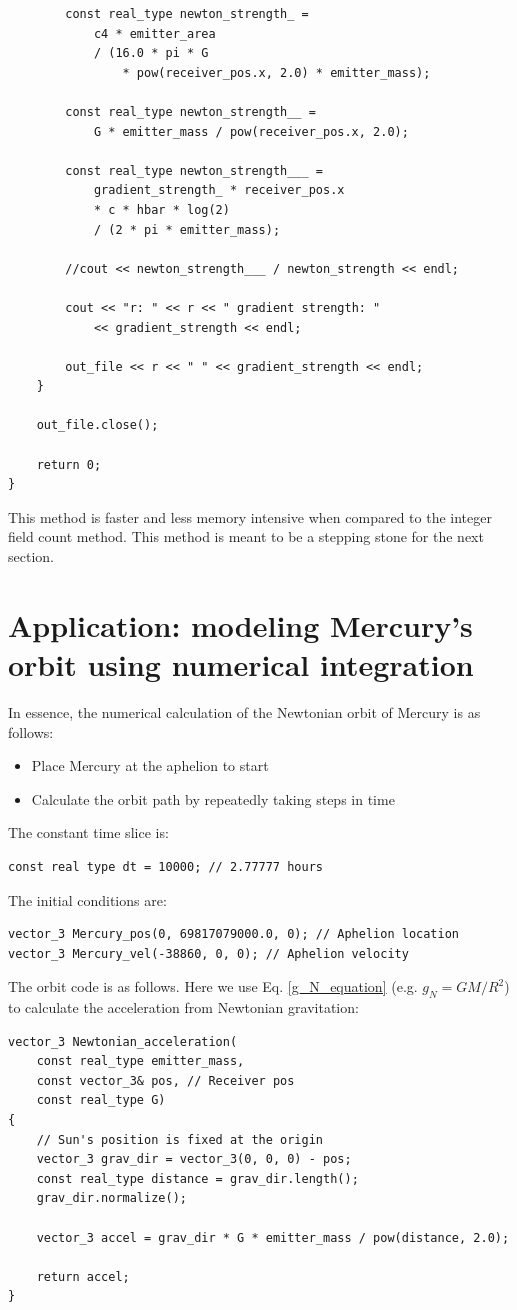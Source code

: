 \documentclass[12pt]{article}
\begin{document}
\begin{lstlisting}
		const real_type newton_strength_ =
			c4 * emitter_area
			/ (16.0 * pi * G 
				* pow(receiver_pos.x, 2.0) * emitter_mass);

		const real_type newton_strength__ =
			G * emitter_mass / pow(receiver_pos.x, 2.0);

		const real_type newton_strength___ =
			gradient_strength_ * receiver_pos.x 
			* c * hbar * log(2)
			/ (2 * pi * emitter_mass);

		//cout << newton_strength___ / newton_strength << endl;

		cout << "r: " << r << " gradient strength: "
			<< gradient_strength << endl;

		out_file << r << " " << gradient_strength << endl;
	}

	out_file.close();

	return 0;
}
\end{lstlisting}

This method is faster and less memory intensive when compared to the integer field count method.
This method is meant to be a stepping stone for the next section.




\section{Application: modeling Mercury's orbit using numerical integration}

In essence, the numerical calculation of the Newtonian orbit of Mercury is as follows:
\begin{itemize}
\item Place Mercury at the aphelion to start
\item Calculate the orbit path by repeatedly taking steps in time
\end{itemize}

The constant time slice is:
\begin{lstlisting}
const real type dt = 10000; // 2.77777 hours
\end{lstlisting}

The initial conditions are:
\begin{lstlisting}
vector_3 Mercury_pos(0, 69817079000.0, 0); // Aphelion location
vector_3 Mercury_vel(-38860, 0, 0); // Aphelion velocity
\end{lstlisting}

The orbit code is as follows. 
Here we use Eq. \ref{g_N_equation} (e.g. $g_N = {G M}/{R^2}$) to calculate the acceleration from Newtonian gravitation:
\begin{lstlisting}
vector_3 Newtonian_acceleration(
	const real_type emitter_mass,
	const vector_3& pos, // Receiver pos
	const real_type G)
{
	// Sun's position is fixed at the origin
	vector_3 grav_dir = vector_3(0, 0, 0) - pos;
	const real_type distance = grav_dir.length();
	grav_dir.normalize();

	vector_3 accel = grav_dir * G * emitter_mass / pow(distance, 2.0);

	return accel;
}
\end{lstlisting}
\end{document}
